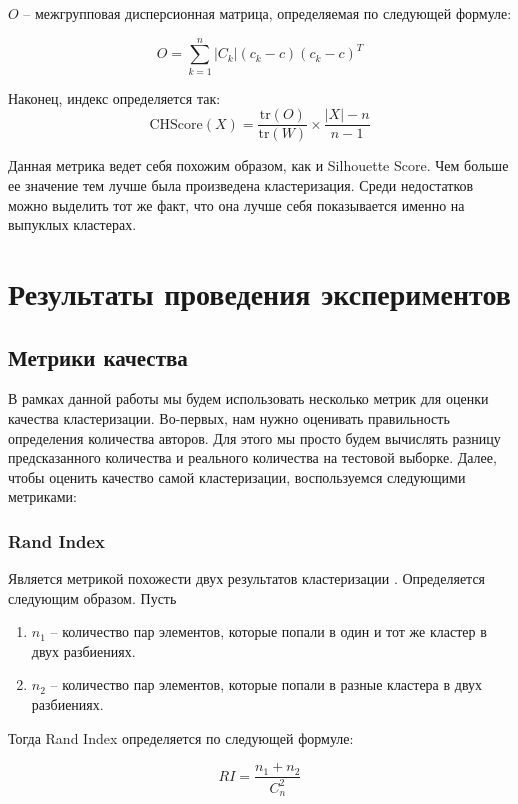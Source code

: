 \bigskip
\noindent
$O$ -- межгрупповая дисперсионная матрица, определяемая по следующей формуле:

$$
O = \sum_{k = 1}^n |C_k|(c_k - c)(c_k - c)^T
$$

\smallskip
\noindent

Наконец, индекс определяется так:
$$
\text{CHScore}(X) = \frac{\text{tr}(O)}{\text{tr}(W)} \times \frac{|X| - n}{n - 1}
$$

Данная метрика ведет себя похожим образом, как и Silhouette Score. Чем больше ее значение тем лучше была произведена кластеризация. Среди недостатков можно выделить тот же факт, что она лучше себя показывается именно на выпуклых кластерах.

\newpage
\section{Результаты проведения экспериментов}

\subsection{Метрики качества}

В рамках данной работы мы будем использовать несколько метрик для оценки качества кластеризации. Во-первых, нам нужно оценивать правильность определения количества авторов. Для этого мы просто будем вычислять разницу предсказанного количества и реального количества на тестовой выборке. Далее, чтобы оценить качество самой кластеризации, воспользуемся следующими метриками:

\subsubsection{Rand Index}

Является метрикой похожести двух результатов кластеризации \cite{rand}. Определяется следующим образом. Пусть

\begin{enumerate}
    \item $n_1$ -- количество пар элементов, которые попали в один и тот же кластер в двух разбиениях.
    \item $n_2$ --  количество пар элементов, которые попали в разные кластера в двух разбиениях.
\end{enumerate}

Тогда Rand Index определяется по следующей формуле:

$$
RI = \frac{n_1 + n_2}{C_n^2}
$$

